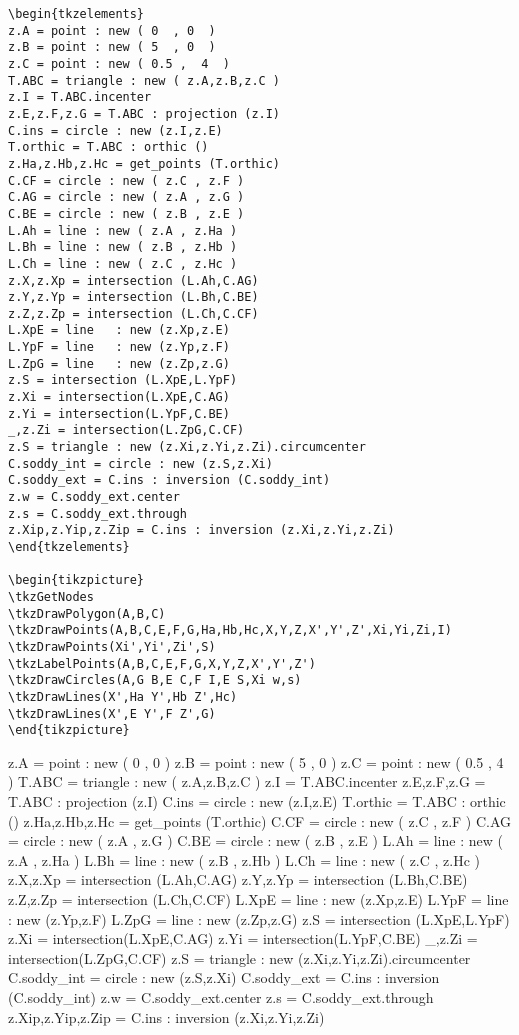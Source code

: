\begin{verbatim}
\begin{tkzelements}
z.A = point : new ( 0  , 0  )
z.B = point : new ( 5  , 0  )
z.C = point : new ( 0.5 ,  4  )
T.ABC = triangle : new ( z.A,z.B,z.C )
z.I = T.ABC.incenter
z.E,z.F,z.G = T.ABC : projection (z.I)
C.ins = circle : new (z.I,z.E)
T.orthic = T.ABC : orthic ()
z.Ha,z.Hb,z.Hc = get_points (T.orthic)
C.CF = circle : new ( z.C , z.F )
C.AG = circle : new ( z.A , z.G )
C.BE = circle : new ( z.B , z.E )
L.Ah = line : new ( z.A , z.Ha )
L.Bh = line : new ( z.B , z.Hb )
L.Ch = line : new ( z.C , z.Hc )
z.X,z.Xp = intersection (L.Ah,C.AG)
z.Y,z.Yp = intersection (L.Bh,C.BE)
z.Z,z.Zp = intersection (L.Ch,C.CF)
L.XpE = line   : new (z.Xp,z.E)
L.YpF = line   : new (z.Yp,z.F)
L.ZpG = line   : new (z.Zp,z.G)
z.S = intersection (L.XpE,L.YpF)
z.Xi = intersection(L.XpE,C.AG)
z.Yi = intersection(L.YpF,C.BE)
_,z.Zi = intersection(L.ZpG,C.CF)
z.S = triangle : new (z.Xi,z.Yi,z.Zi).circumcenter
C.soddy_int = circle : new (z.S,z.Xi)
C.soddy_ext = C.ins : inversion (C.soddy_int)
z.w = C.soddy_ext.center
z.s = C.soddy_ext.through
z.Xip,z.Yip,z.Zip = C.ins : inversion (z.Xi,z.Yi,z.Zi)
\end{tkzelements}

\begin{tikzpicture}
\tkzGetNodes
\tkzDrawPolygon(A,B,C)
\tkzDrawPoints(A,B,C,E,F,G,Ha,Hb,Hc,X,Y,Z,X',Y',Z',Xi,Yi,Zi,I)
\tkzDrawPoints(Xi',Yi',Zi',S)
\tkzLabelPoints(A,B,C,E,F,G,X,Y,Z,X',Y',Z')
\tkzDrawCircles(A,G B,E C,F I,E S,Xi w,s)
\tkzDrawLines(X',Ha Y',Hb Z',Hc)
\tkzDrawLines(X',E Y',F Z',G)
\end{tikzpicture}
\end{verbatim}

\begin{tkzelements}
z.A = point : new ( 0  , 0  )
z.B = point : new ( 5  , 0  )
z.C = point : new ( 0.5 ,  4  )
T.ABC = triangle : new ( z.A,z.B,z.C )
z.I = T.ABC.incenter
z.E,z.F,z.G = T.ABC : projection (z.I)
C.ins = circle : new (z.I,z.E)
T.orthic = T.ABC : orthic ()
z.Ha,z.Hb,z.Hc = get_points (T.orthic)
C.CF = circle : new ( z.C , z.F )
C.AG = circle : new ( z.A , z.G )
C.BE = circle : new ( z.B , z.E )
L.Ah = line : new ( z.A , z.Ha )
L.Bh = line : new ( z.B , z.Hb )
L.Ch = line : new ( z.C , z.Hc )
z.X,z.Xp = intersection (L.Ah,C.AG)
z.Y,z.Yp = intersection (L.Bh,C.BE)
z.Z,z.Zp = intersection (L.Ch,C.CF)
L.XpE = line   : new (z.Xp,z.E)
L.YpF = line   : new (z.Yp,z.F)
L.ZpG = line   : new (z.Zp,z.G)
z.S = intersection (L.XpE,L.YpF)
z.Xi = intersection(L.XpE,C.AG)
z.Yi = intersection(L.YpF,C.BE)
_,z.Zi = intersection(L.ZpG,C.CF)
z.S = triangle : new (z.Xi,z.Yi,z.Zi).circumcenter
C.soddy_int = circle : new (z.S,z.Xi)
C.soddy_ext = C.ins : inversion (C.soddy_int)
z.w = C.soddy_ext.center
z.s = C.soddy_ext.through
z.Xip,z.Yip,z.Zip = C.ins : inversion (z.Xi,z.Yi,z.Zi)
\end{tkzelements}

